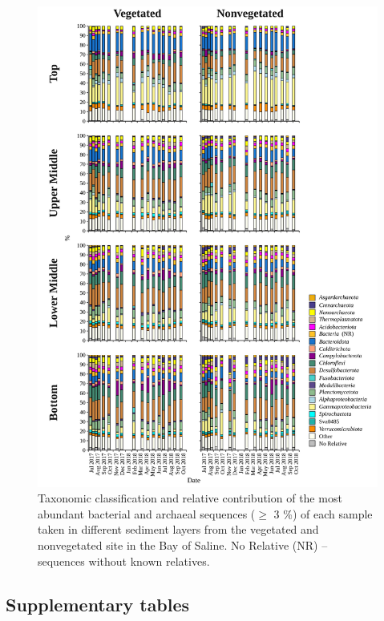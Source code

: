 \documentclass[12pt,]{article}
\begin{document}
\begin{figure}[H]

{\centering \includegraphics[width=1\linewidth,height=0.9\textheight]{../results/figures/community_barplot_month} 

}

\caption{Taxonomic classification and relative contribution of the most abundant bacterial and archaeal sequences ($\geq$ 3 \si{\percent}) of each sample taken in different sediment layers from the vegetated and nonvegetated site in the Bay of Saline. No Relative (NR) -- sequences without known relatives.\label{community_barplot_month}}\label{fig:unnamed-chunk-6}
\end{figure}

\newpage

\hypertarget{supplementary-tables}{%
\subsection{Supplementary tables}\label{supplementary-tables}}
\end{document}
